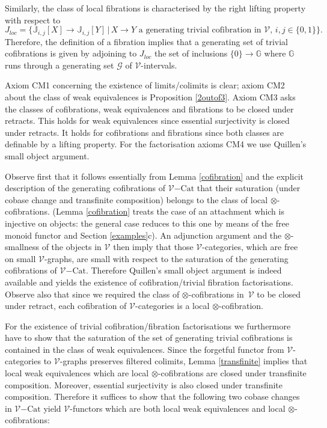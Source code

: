 \documentclass[10pt]{amsart}
\theoremstyle{plain}
\theoremstyle{remark}
\def\Vv{\mathcal{V}}
\def\Cat{\mathrm{Cat}}
\def\VCat{\Vv\mathrm{-}\Cat}
\def\JJ{\mathbb{J}}
\def\Gg{\mathcal{G}}
\def\GG{\mathbb{G}}
\begin{document}
Similarly, the class of local fibrations is characterised by the right lifting property with respect to$$J_{loc}=\{\JJ_{i,j}[X]\to\JJ_{i,j}[Y]\,|\,X\to Y\textrm{ a generating trivial cofibration in }\Vv,\,i,j\in\{0,1\}\}.$$ Therefore, the definition of a fibration implies that a generating set of trivial cofibrations is given by adjoining to $J_{loc}$ the set of inclusions $\{0\}\to\GG$ where $\GG$ runs through a generating set $\Gg$ of $\Vv$-intervals.


Axiom CM1 concerning the existence of limits/colimits is clear; axiom CM2 about the class of weak equivalences is Proposition \ref{2outof3}. Axiom CM3 asks the classes of cofibrations, weak equivalences and fibrations to be closed under retracts. This holds for weak equivalences since essential surjectivity is closed under retracts. It holds for cofibrations and fibrations since both classes are definable by a lifting property. For the factorisation axioms CM4 we use Quillen's small object argument.

Observe first that it follows essentially from Lemma \ref{cofibration} and the explicit description of the generating cofibrations of $\VCat$ that their saturation (under cobase change and transfinite composition) belongs to the class of local $\otimes$-cofibrations. (Lemma \ref{cofibration} treats the case of an attachment which is injective on objects: the general case reduces to this one by means of the free monoid functor and Section \ref{examples}c). An adjunction argument and the $\otimes$-smallness of the objects in $\Vv$ then imply that those $\Vv$-categories, which are free on small $\Vv$-graphs, are small with respect to the saturation of the generating cofibrations of $\VCat$. Therefore Quillen's small object argument is indeed available and yields the existence of cofibration/trivial fibration factorisations. Observe also that since we required the class of $\otimes$-cofibrations in $\,\Vv$ to be closed under retract, each cofibration of $\Vv$-categories is a local $\otimes$-cofibration.

For the existence of trivial cofibration/fibration factorisations we furthermore have to show that the saturation of the set of generating trivial cofibrations is contained in the class of weak equivalences. Since the forgetful functor from $\Vv$-categories to $\Vv$-graphs preserves filtered colimits, Lemma \ref{transfinite} implies that local weak equivalences which are local $\otimes$-cofibrations are closed under transfinite composition. Moreover, essential surjectivity is also closed under transfinite composition. Therefore it suffices to show that the following two cobase changes in $\VCat$ yield $\Vv$-functors which are both local weak equivalences and local $\otimes$-cofibrations:
\end{document}
